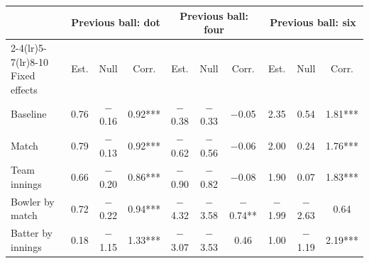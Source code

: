 \begin{tabular}{lccccccccc}
\toprule
 & \multicolumn{3}{c}{Previous ball: dot} & \multicolumn{3}{c}{Previous ball: four} & \multicolumn{3}{c}{Previous ball: six} \\
\cmidrule(lr){2-4}\cmidrule(lr){5-7}\cmidrule(lr){8-10}
Fixed effects & Est. & Null & Corr. & Est. & Null & Corr. & Est. & Null & Corr. \\
\midrule
Baseline & 0.76 & $-$0.16 & 0.92*** & $-$0.38 & $-$0.33 & $-$0.05 & 2.35 & 0.54 & 1.81*** \\
Match & 0.79 & $-$0.13 & 0.92*** & $-$0.62 & $-$0.56 & $-$0.06 & 2.00 & 0.24 & 1.76*** \\
Team innings & 0.66 & $-$0.20 & 0.86*** & $-$0.90 & $-$0.82 & $-$0.08 & 1.90 & 0.07 & 1.83*** \\
Bowler by match & 0.72 & $-$0.22 & 0.94*** & $-$4.32 & $-$3.58 & $-$0.74** & $-$1.99 & $-$2.63 & 0.64 \\
Batter by innings & 0.18 & $-$1.15 & 1.33*** & $-$3.07 & $-$3.53 & 0.46 & 1.00 & $-$1.19 & 2.19*** \\
\bottomrule
\end{tabular}
